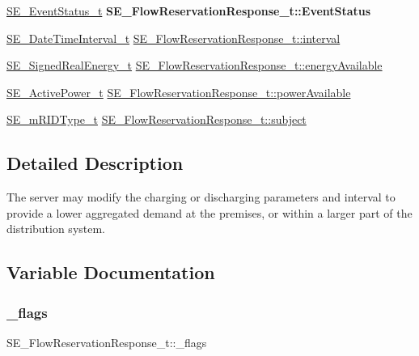 \begin{DoxyCompactItemize}
\mbox{\label{group__FlowReservationResponse_gade416f283c7d5f6afec43d7eca231a43}} 
\hyperlink{structSE__EventStatus__t}{S\+E\+\_\+\+Event\+Status\+\_\+t} {\bfseries S\+E\+\_\+\+Flow\+Reservation\+Response\+\_\+t\+::\+Event\+Status}
\item 
\hyperlink{structSE__DateTimeInterval__t}{S\+E\+\_\+\+Date\+Time\+Interval\+\_\+t} \hyperlink{group__FlowReservationResponse_gaafbea15eb46c96dc2974f9115d80ade2}{S\+E\+\_\+\+Flow\+Reservation\+Response\+\_\+t\+::interval}
\item 
\hyperlink{structSE__SignedRealEnergy__t}{S\+E\+\_\+\+Signed\+Real\+Energy\+\_\+t} \hyperlink{group__FlowReservationResponse_gabaac9e778afebc6169fa38de9a1b476c}{S\+E\+\_\+\+Flow\+Reservation\+Response\+\_\+t\+::energy\+Available}
\item 
\hyperlink{structSE__ActivePower__t}{S\+E\+\_\+\+Active\+Power\+\_\+t} \hyperlink{group__FlowReservationResponse_gaf4730941a5e6075d599eeb5173d5cd1e}{S\+E\+\_\+\+Flow\+Reservation\+Response\+\_\+t\+::power\+Available}
\item 
\hyperlink{group__mRIDType_gac74622112f3a388a2851b2289963ba5e}{S\+E\+\_\+m\+R\+I\+D\+Type\+\_\+t} \hyperlink{group__FlowReservationResponse_gabbd0fa2ff3f086063ddf07aa555b0183}{S\+E\+\_\+\+Flow\+Reservation\+Response\+\_\+t\+::subject}
\end{DoxyCompactItemize}


\subsection{Detailed Description}
The server may modify the charging or discharging parameters and interval to provide a lower aggregated demand at the premises, or within a larger part of the distribution system. 

\subsection{Variable Documentation}
\mbox{\label{group__FlowReservationResponse_ga84d53e405769d4e812dca9f816988bce}} 
\subsubsection{\texorpdfstring{\+\_\+flags}{\_flags}}
{\footnotesize\ttfamily S\+E\+\_\+\+Flow\+Reservation\+Response\+\_\+t\+::\+\_\+flags}

